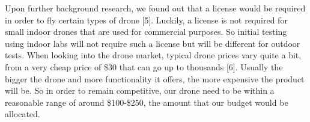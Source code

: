 \documentclass[12pt]{article}
\begin{document}
\begin{enumerate}[label=\Alph*.]
                \indent Upon further background research, we found out that a license would be required in order to fly certain types of drone [5].
                Luckily, a license is not required for small indoor drones that are used for commercial purposes.
                So initial testing using indoor labs will not require such a license but will be different for outdoor tests.
                When looking into the drone market, typical drone prices vary quite a bit, from a very cheap price of \$30 that can go up to thousands [6].
                Usually the bigger the drone and more functionality it offers, the more expensive the product will be.
                So in order to remain competitive, our drone need to be within a reasonable range of around \$100-\$250, the amount that our budget would be allocated.
                

\end{enumerate}
\end{document}

